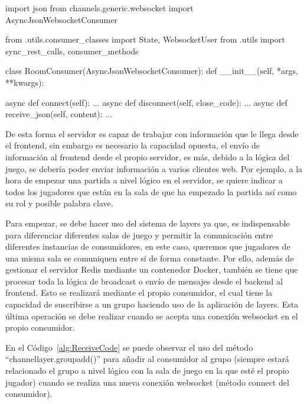 \begin{mypython}[float={h},caption={RoomConsumer},label={alg:RoomConsumer}]
	import json
	from channels.generic.websocket import AsyncJsonWebsocketConsumer
																																																	
	from .utils.consumer_classes import State, WebsocketUser
	from .utils import sync_rest_calls, consumer_methods
	
	class RoomConsumer(AsyncJsonWebsocketConsumer):
	def __init__(self, *args, **kwargs):
																																																	
	async def connect(self): ...																																			
	async def disconnect(self, close_code):	...																																			
	async def receive_json(self, content): ...	
\end{mypython}

De esta forma el servidor es capaz de trabajar con información que le llega desde el frontend, sin embargo es necesario la capacidad opuesta, el envío de información al 
frontend desde el propio servidor, es más, debido a la lógica del juego, se debería poder enviar información a varios clientes web. Por ejemplo, a la hora de empezar una partida
a nivel lógico en el servidor, se quiere indicar a todos los jugadores que están en la sala de que ha empezado la partida así como su rol y posible palabra clave.

Para empezar, se debe hacer uso del sistema de layers ya que, es indispensable para diferenciar diferentes salas de juego y permitir 
la comunicación entre diferentes instancias de consumidores, en este caso, queremos que jugadores de una misma sala se comuniquen entre sí de forma constante. 
Por ello, además de gestionar el servidor Redis mediante un contenedor Docker, también se tiene que procesar toda la lógica de broadcast
o envío de mensajes desde el backend al frontend. Esto se realizará mediante el propio consumidor, el cual tiene la capacidad de suscribirse a un grupo haciendo uso
de la aplicación de layers. Esta última operación se debe realizar cuando se acepta una conexión websocket en el propio consumidor. 

En el Código~\ref{alg:ReceiveCode} se puede observar el uso del método ``channel\textunderscore layer.group\textunderscore add()'' para añadir al consumidor
al grupo (siempre estará relacionado el grupo a nivel lógico con la sala de juego en la que esté el propio jugador) cuando se realiza una nueva conexión websocket (método connect del consumidor). 

